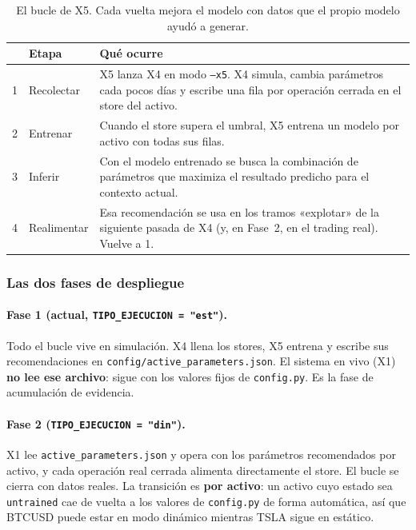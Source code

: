 \documentclass[11pt,a4paper]{article}
\newcommand{\code}[1]{\texttt{\small #1}}
\begin{document}
\begin{table}[h]
\centering
\small
\begin{tabularx}{\linewidth}{@{}r l X@{}}
\toprule
& \textbf{Etapa} & \textbf{Qué ocurre} \\
\midrule
1 & Recolectar & X5 lanza X4 en modo \code{--x5}. X4 simula, cambia parámetros cada pocos días y escribe una fila por operación cerrada en el store del activo. \\
2 & Entrenar & Cuando el store supera el umbral, X5 entrena un modelo por activo con todas sus filas. \\
3 & Inferir & Con el modelo entrenado se busca la combinación de parámetros que maximiza el resultado predicho para el contexto actual. \\
4 & Realimentar & Esa recomendación se usa en los tramos «explotar» de la siguiente pasada de X4 (y, en Fase~2, en el trading real). Vuelve a 1. \\
\bottomrule
\end{tabularx}
\caption{El bucle de X5. Cada vuelta mejora el modelo con datos que el propio modelo ayudó a generar.}
\end{table}

\subsubsection{Las dos fases de despliegue}

\paragraph{Fase 1 (actual, \code{TIPO_EJECUCION = "est"}).} Todo el bucle vive en simulación.
X4 llena los stores, X5 entrena y escribe sus recomendaciones en
\code{config/active_parameters.json}. El sistema en vivo (X1) \textbf{no lee ese archivo}:
sigue con los valores fijos de \code{config.py}. Es la fase de acumulación de evidencia.

\paragraph{Fase 2 (\code{TIPO_EJECUCION = "din"}).} X1 lee
\code{active_parameters.json} y opera con los parámetros recomendados por activo, y cada
operación real cerrada alimenta directamente el store. El bucle se cierra con datos reales.
La transición es \textbf{por activo}: un activo cuyo estado sea \code{untrained} cae de vuelta
a los valores de \code{config.py} de forma automática, así que BTCUSD puede estar en modo
dinámico mientras TSLA sigue en estático.
\end{document}
